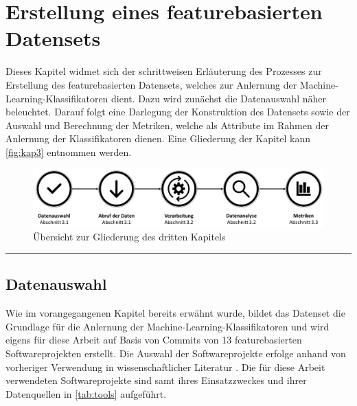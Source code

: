 
\chapter{Erstellung eines featurebasierten Datensets}
\label{dataset-creation}

Dieses Kapitel widmet sich der schrittweisen Erläuterung des Prozesses zur Erstellung des featurebasierten Datensets, welches zur Anlernung der Machine-Learning-Klassifikatoren dient. Dazu wird zunächst die Datenauswahl näher beleuchtet. Darauf folgt eine Darlegung der Konstruktion des Datensets sowie der Auswahl und Berechnung der Metriken, welche als Attribute im Rahmen der Anlernung der Klassifikatoren dienen. Eine Gliederung der Kapitel kann \autoref{fig:kap3} entnommen werden.

\begin{figure}[H]
    \centering
    \includegraphics[width=\textwidth]{images/Kap3}
    \caption{Übersicht zur Gliederung des dritten Kapitels\label{fig:kap3}}
\end{figure}

\hrule

\section{Datenauswahl}

Wie im vorangegangenen Kapitel bereits erwähnt wurde, bildet das Datenset die Grundlage für die Anlernung der Machine-Learning-Klassifikatoren und wird eigens für diese Arbeit auf Basis von Commits von 13 featurebasierten Softwareprojekten erstellt. Die Auswahl der Softwareprojekte erfolge anhand von vorheriger Verwendung in wissenschaftlicher Literatur \cite{Hunsen2015,Liebig2010,Queiroz2015,Queiroz2016}. Die für diese Arbeit verwendeten Softwareprojekte sind samt ihres Einsatzzweckes und ihrer Datenquellen in \autoref{tab:tools} aufgeführt.

